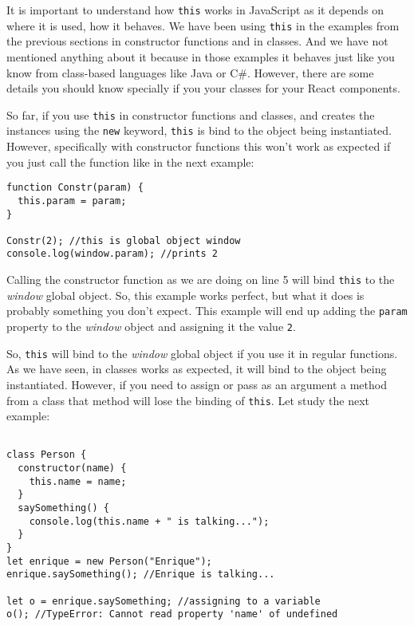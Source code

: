 \documentclass[a4paper, oneside, titlepage, 12pt]{book}
\begin{document}
It is important to understand how \texttt{this} works in JavaScript as it depends on where it is used, how it behaves. We have been using \texttt{this} in the examples from the previous sections in constructor functions and in classes. And we have not mentioned anything about it because in those examples it behaves just like you know from class-based languages like Java or C\#. However, there are some details you should know specially if you your classes for your React components.

So far, if you use \texttt{this} in constructor functions and classes, and creates the instances using the \texttt{new} keyword, \texttt{this} is bind to the object being instantiated. However, specifically with constructor functions this won't work as expected if you just call the function like in the next example: 

\begin{verbatim}
function Constr(param) {
  this.param = param;
}

Constr(2); //this is global object window
console.log(window.param); //prints 2
\end{verbatim}

Calling the constructor function as we are doing on line 5 will bind \texttt{this} to the \textit{window} global object. So, this example works perfect, but what it does is probably something you don't expect. This example will end up adding the \texttt{param} property to the \textit{window} object and assigning it the value \texttt{2}.

So, \texttt{this} will bind to the \textit{window} global object if you use it in regular functions. As we have seen, in classes works as expected, it will bind to the object being instantiated. However, if you need to assign or pass as an argument a method from a class that method will lose the binding of \texttt{this}. Let study the next example:

\begin{verbatim}

class Person {
  constructor(name) {
    this.name = name;
  }
  saySomething() {
    console.log(this.name + " is talking...");
  }
}
let enrique = new Person("Enrique");
enrique.saySomething(); //Enrique is talking...

let o = enrique.saySomething; //assigning to a variable
o(); //TypeError: Cannot read property 'name' of undefined
\end{verbatim}
\end{document}
